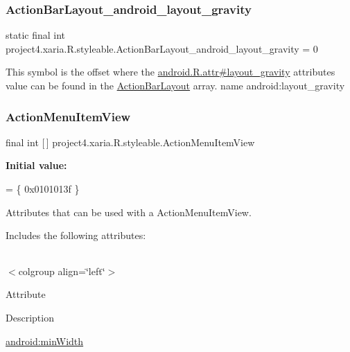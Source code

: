 \subsubsection{\texorpdfstring{Action\+Bar\+Layout\+\_\+android\+\_\+layout\+\_\+gravity}{ActionBarLayout\_android\_layout\_gravity}}
{\footnotesize\ttfamily static final int project4.\+xaria.\+R.\+styleable.\+Action\+Bar\+Layout\+\_\+android\+\_\+layout\+\_\+gravity = 0\hspace{0.3cm}{\ttfamily [static]}}

This symbol is the offset where the \hyperlink{}{android.\+R.\+attr\#layout\+\_\+gravity} attribute\textquotesingle{}s value can be found in the \hyperlink{classproject4_1_1xaria_1_1R_1_1styleable_ada09e4a37ff0e4e66c0304b7927de70f}{Action\+Bar\+Layout} array.  name android\+:layout\+\_\+gravity \mbox{\label{classproject4_1_1xaria_1_1R_1_1styleable_adc45f11ac1a2148137a78ceb6d3af625}} 
\subsubsection{\texorpdfstring{Action\+Menu\+Item\+View}{ActionMenuItemView}}
{\footnotesize\ttfamily final int \mbox{[}$\,$\mbox{]} project4.\+xaria.\+R.\+styleable.\+Action\+Menu\+Item\+View\hspace{0.3cm}{\ttfamily [static]}}

{\bfseries Initial value\+:}
\begin{DoxyCode}
= \{
            0x0101013f
        \}
\end{DoxyCode}
Attributes that can be used with a Action\+Menu\+Item\+View. 

Includes the following attributes\+:

\tabulinesep=1mm
\begin{longtabu} spread 0pt [c]{*{0}{|X[-1]}|}
\hline
\end{longtabu}
$<$colgroup align=\char`\"{}left\char`\"{}$>$ 

Attribute

Description 

{\ttfamily \hyperlink{classproject4_1_1xaria_1_1R_1_1styleable_aabb664763125f8102a4fbfe83c0b8042}{android\+:min\+Width}}

